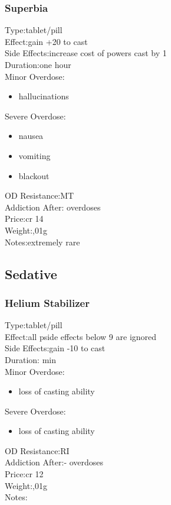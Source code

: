 \documentclass[12pt,a4paper,openany]{book}
\begin{document}
	\subsubsection{Superbia}
	Type:\tab tablet/pill\\
	Effect:\tab gain +20 to cast\\
	Side Effects:\tab increase cost of powers cast by 1\\
	Duration:\tab one hour\\
	Minor Overdose:\\
	\begin{itemize}
		\setlength\itemsep{-8mm}
		\vspace{-12mm}
		\item hallucinations
	\end{itemize}
	Severe Overdose:\\
	\begin{itemize}
		\setlength\itemsep{-8mm}
		\vspace{-12mm}
		\item nausea
		\item vomiting
		\item blackout
	\end{itemize}
	OD Resistance:\tab MT\\
	Addiction After: overdoses\\
	Price:\tab cr 14\\
	Weight:,01g\\
	Notes:\tab extremely rare

	\subsection{Sedative}
	\subsubsection{Helium Stabilizer}
	Type:\tab tablet/pill\\
	Effect:\tab all pside effects below 9 are ignored\\
	Side Effects:\tab gain -10 to cast\\
	Duration: min\\
	Minor Overdose:\\
	\begin{itemize}
		\setlength\itemsep{-8mm}
		\vspace{-12mm}
		\item loss of casting ability
	\end{itemize}
	Severe Overdose:\\
	\begin{itemize}
		\setlength\itemsep{-8mm}
		\vspace{-12mm}
		\item loss of casting ability
	\end{itemize}
	OD Resistance:\tab RI\\
	Addiction After:\tab - overdoses\\
	Price:\tab cr 12\\
	Weight:,01g\\
	Notes:\tab
\end{document}
